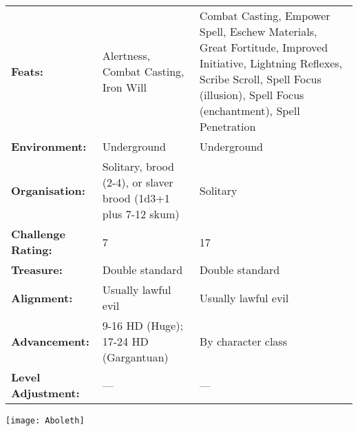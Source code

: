\documentclass[../main.tex]{subfiles}
\begin{document}
\begin{table}[]
\begin{tabular}{p{9em}p{16em}p{20em}}
\textbf{Feats:} & Alertness, Combat Casting, Iron Will & Combat Casting, Empower Spell, Eschew Materials, Great Fortitude, Improved Initiative, Lightning Reflexes, Scribe Scroll, Spell Focus (illusion), Spell Focus (enchantment), Spell Penetration \\
\rowcolor[HTML]{FFCE93}
\textbf{Environment:} & Underground & Underground \\
\textbf{Organisation:} & Solitary, brood (2-4), or slaver brood (1d3+1 plus 7-12 skum) & Solitary \\
\rowcolor[HTML]{FFCE93}
\textbf{Challenge Rating:} & 7 & 17 \\
\textbf{Treasure:} & Double standard & Double standard \\
\rowcolor[HTML]{FFCE93}
\textbf{Alignment:} & Usually lawful evil & Usually lawful evil \\
\textbf{Advancement:} & 9-16 HD (Huge); 17-24 HD (Gargantuan) & By character class \\
\rowcolor[HTML]{FFCE93}
\textbf{Level Adjustment:} & --- & ---
\end{tabular}
\end{table}

\texttt{[image: Aboleth]}
\end{document}
